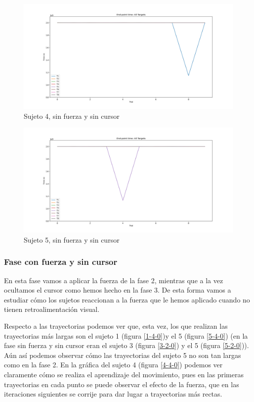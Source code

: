 \documentclass[a4paper,11pt, oneside]{book}
\begin{document}
\begin{figure}[H]
	\includegraphics[width=\linewidth]{sujeto4/no_force_no_cursor/evolution_time}
	\caption{Sujeto 4, sin  fuerza y sin cursor}
	\label{4-3-4}
\end{figure}
\begin{figure}[H]
	\includegraphics[width=\linewidth]{sujeto5/no_force_no_cursor/evolution_time}
	\caption{Sujeto 5, sin  fuerza y sin cursor}
	\label{5-3-4}
\end{figure}


\subsubsection{Fase con fuerza y sin cursor}

En esta fase vamos a aplicar la fuerza de la fase 2, mientras que a la vez ocultamos el cursor como hemos hecho en la fase 3. De esta forma vamos a estudiar cómo los sujetos reaccionan a la fuerza que le hemos aplicado cuando no tienen retroalimentación visual.


Respecto a las trayectorias podemos ver que, esta vez, los que realizan las trayectorias más largas son el sujeto 1 (figura \ref{1-4-0})y el 5 (figura \ref{5-4-0}) (en la fase sin fuerza y sin cursor eran el sujeto 3 (figura \ref{3-2-0}) y el 5 (figura \ref{5-2-0})). Aún así podemos observar cómo las trayectorias del sujeto 5 no son tan largas como en la fase 2. En la gráfica del sujeto 4 (figura \ref{4-4-0}) podemos ver claramente cómo se realiza el aprendizaje del movimiento, pues en las primeras trayectorias en cada punto se puede observar el efecto de la fuerza, que en las iteraciones siguientes se corrije para dar lugar a trayectorias más rectas.
\end{document}
